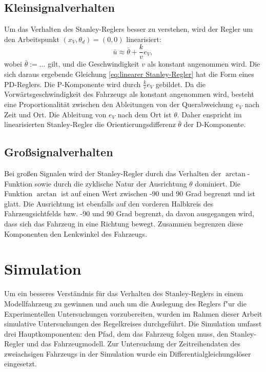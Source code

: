 \documentclass[arbeit=studie,oneside,BCOR=12mm]{ArbeitRST}
\begin{document}
\subsection{Kleinsignalverhalten}


Um das Verhalten des Stanley-Reglers besser zu verstehen, wird der Regler um
den Arbeitspunkt $\left(x_V, \theta_d\right) = \left(0, 0\right)$
linearisiert: 
\begin{equation} \bar{u} \approx \bar{\theta} + \frac{k}{v}e_{V}, 
    \label{eq:linearer Stanley-Regler}
\end{equation}
wobei $\bar \theta:= ... $ gilt, und die Geschwindigkeit $v$ als konstant
angenommen wird. Die sich daraus ergebende Gleichung \eqref{eq:linearer
Stanley-Regler} hat die Form eines PD-Reglers. Die P-Komponente wird durch
\(\frac{k}{v}e_{V}\) gebildet. Da die Vorwärtsgeschwindigkeit des Fahrzeugs als
konstant angenommen wird, besteht eine Proportionalität zwischen den
Ableitungen von der Querabweichung \(e_{V}\) nach Zeit und Ort. Die Ableitung
von \(e_{V}\) nach dem Ort ist \(\theta\). Daher enspricht im linearisierten
Stanley-Regler die Orientierungsdifferenz \(\bar\theta\) der D-Komponente.

\subsection{Gro{\ss}signalverhalten}

Bei großen Signalen wird der Stanley-Regler durch das Verhalten der
$\arctan$-Funktion sowie durch die zyklische Natur der Ausrichtung
\(\theta\) dominiert. Die Funktion $\arctan$ ist auf einen Wert zwischen
-90 und 90 Grad begrenzt und ist glatt. Die Ausrichtung ist ebenfalls auf den
vorderen Halbkreis des Fahrzeugsichtfelds bzw. -90 und 90 Grad begrenzt, da davon ausgegangen wird,
dass sich das Fahrzeug in eine Richtung bewegt. Zusammen begrenzen diese
Komponenten den Lenkwinkel des Fahrzeugs.

\section{Simulation}

Um ein besseres Verständnis für das Verhalten des Stanley-Reglers in einem
Modellfahrzeug zu gewinnen und auch um die Auslegung des Reglers f"ur die Experimentellen
Untersuchungen vorzubereiten, wurden im Rahmen dieser Arbeit simulative Untersuchungen
des Regelkreises durchgeführt. Die Simulation umfasst drei Hauptkomponenten: den
Pfad, dem das Fahrzeug folgen muss, den Stanley-Regler und das Fahrzeugmodell.
Zur Untersuchung der Zeitreihendaten des zweiachsigen Fahrzeugs in der
Simulation wurde ein Differentialgleichungslöser eingesetzt.
\end{document}
